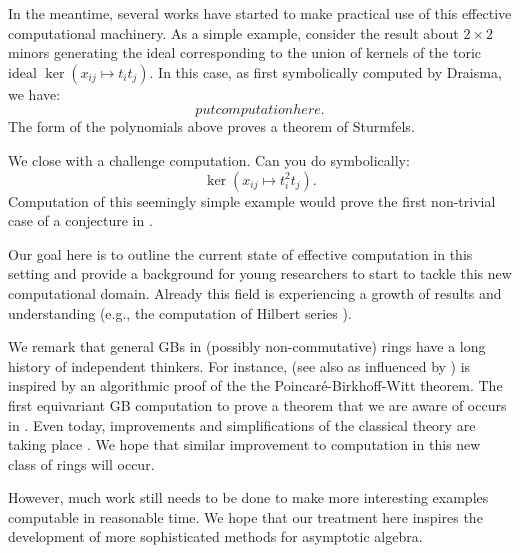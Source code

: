 In the meantime, several works have started to make practical use of this effective computational machinery.  As a simple example, consider the result about $2 \times 2$ minors generating the ideal corresponding to the union of kernels of the toric ideal $\ker{(x_{ij} \mapsto t_i t_j)}$.  In this case, as first symbolically computed by Draisma, we have:
\[ put computation here.\]
The form of the polynomials above proves a theorem of Sturmfels.

We close with a challenge computation.  Can you do symbolically:
\[ \ker{(x_{ij} \mapsto t_i^2 t_j)}.\]
Computation of this seemingly simple example would prove the first non-trivial case of a conjecture in \cite{aschenbrenner2007finite}.

Our goal here is to outline the current state of effective computation in this setting and provide a background for young researchers to start to tackle this new computational domain.  Already this field is experiencing a growth of results and understanding (e.g., the computation of Hilbert series \cite{Nagel, krone2016hilbert}).

We remark that general GBs in (possibly non-commutative) rings have a long history of independent thinkers.  For instance, \cite{bergman1978diamond} (see also \cite{bokut1976embeddings} as influenced by \cite{shirshov1962some}) is inspired by an algorithmic proof of the the Poincar\'e-Birkhoff-Witt theorem.  The first equivariant GB computation to prove a theorem that we are aware of occurs in \cite{Brouwer09e}. Even today, improvements and simplifications of the classical theory are taking place \cite{schauenburg2007grobner}.  We hope that similar improvement to computation in this new class of rings will occur.

However, much work still needs to be done to make more interesting examples computable in reasonable time.  We hope that our treatment here inspires the development of more sophisticated methods for asymptotic algebra.






